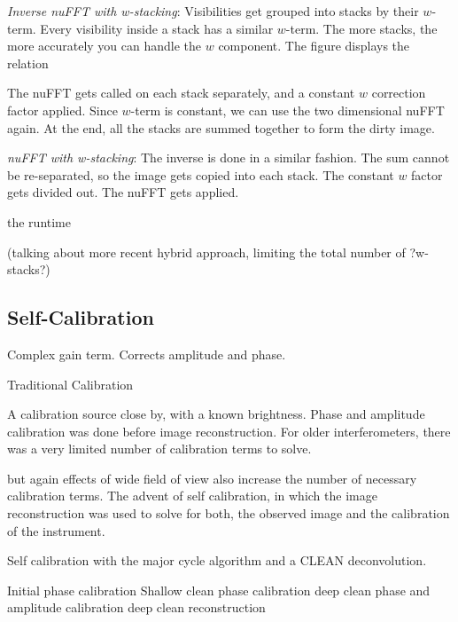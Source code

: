 \textit{Inverse nuFFT with w-stacking}:
Visibilities get grouped into stacks by their $w$-term. Every visibility inside a stack has a similar $w$-term. The more stacks, the more accurately you can handle the $w$ component. The figure displays the relation

The nuFFT gets called on each stack separately, and a constant $w$ correction factor applied. Since $w$-term is constant, we can use the two dimensional nuFFT again. At the end, all the stacks are summed together to form the dirty image. 

\textit{nuFFT with w-stacking}:
The inverse is done in a similar fashion. The sum cannot be re-separated, so the image gets copied into each stack. The constant $w$ factor gets divided out. The nuFFT gets applied.

the runtime

(talking about more recent hybrid approach, limiting the total number of ?w-stacks?)



\subsection{Self-Calibration}
Complex gain term. Corrects amplitude and phase. 

Traditional Calibration

A calibration source close by, with a known brightness. Phase and amplitude calibration was done before image reconstruction. For older interferometers, there was a very limited number of calibration terms to solve.


but again effects of wide field of view also increase the number of necessary calibration terms. The advent of self calibration, in which the image reconstruction was used to solve for both, the observed image and the calibration of the instrument.

Self calibration with the major cycle algorithm and a CLEAN deconvolution.

Initial phase calibration
Shallow clean
phase calibration
deep clean
phase and amplitude calibration
deep clean
reconstruction






